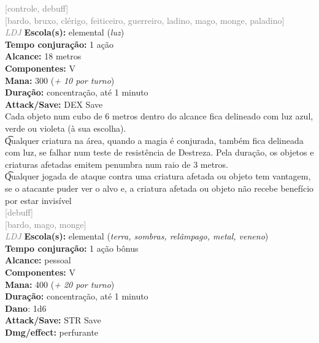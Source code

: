 \documentclass{RPG_Adventure}[2021/10/20]
\begin{document}
{\scriptsize \textcolor{gray}{[controle, debuff]\\}}
{\scriptsize \textcolor{gray}{[bardo, bruxo, clérigo, feiticeiro, guerreiro, ladino, mago, monge, paladino]\\}}
{\tiny \textcolor{gray}{\textit{LDJ}}}
{\small \t \textbf{Escola(s):} elemental (\textit{luz})\\\t \textbf{Tempo conjuração:} 1 ação\\\t \textbf{Alcance:} 18 metros\\\t \textbf{Componentes:} V\\\t \textbf{Mana:} 300 (\textit{+ 10 por turno})\\\t \textbf{Duração:} concentração, até 1 minuto\\\t \textbf{Attack/Save:} DEX Save\\}
{\normalsize Cada objeto num cubo de 6 metros dentro do alcance fica delineado com luz azul, verde ou violeta (à sua escolha).\\\t Qualquer criatura na área, quando a magia é conjurada, também fica delineada com luz, se falhar num teste de resistência de Destreza. Pela duração, os objetos e criaturas afetadas emitem penumbra num raio de 3 metros.\\\t Qualquer jogada de ataque contra uma criatura afetada ou objeto tem vantagem, se o atacante puder ver o alvo e, a criatura afetada ou objeto não recebe benefício por estar invisível\\}
{\scriptsize \textcolor{gray}{[debuff]\\}}
{\scriptsize \textcolor{gray}{[bardo, mago, monge]\\}}
{\tiny \textcolor{gray}{\textit{LDJ}}}
{\small \t \textbf{Escola(s):} elemental (\textit{terra, sombras, relâmpago, metal, veneno})\\\t \textbf{Tempo conjuração:} 1 ação bônus\\\t \textbf{Alcance:} pessoal\\\t \textbf{Componentes:} V\\\t \textbf{Mana:} 400 (\textit{+ 20 por turno})\\\t \textbf{Duração:} concentração, até 1 minuto\\\t \textbf{Dano}: 1d6\\\t \textbf{Attack/Save:} STR Save\\\t \textbf{Dmg/effect:} perfurante\\}
\end{document}
